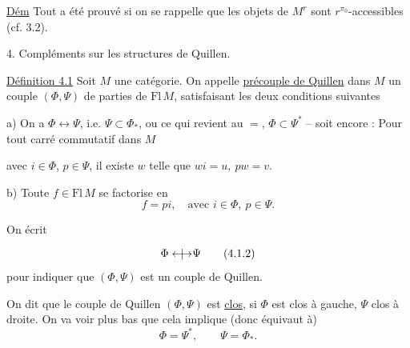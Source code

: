 
\uline{Dém} Tout a été prouvé\unsure{,|\}} si on se rappelle que les
objets de $M^r$ sont $r^{\pi_0}$-accessibles (cf. 3.2).


4. Compléments sur les structures de Quillen.

\uline{Définition 4.1} Soit $M$ une catégorie. On appelle
\uline{précouple de Quillen} dans $M$ un couple
$(\Phi,\Psi)$ de parties de $\mathrm{Fl}\,M$, satisfaisant les
deux conditions suivantes

a) On a $\Phi\longleftrightarrow\Psi$, i.e. $\Psi\subset\Phi_*$, ou ce qui revient
au $=$, $\Phi\subset\Psi^*$  -- soit encore : Pour
tout carré commutatif dans $M$

avec $i\in\Phi$, $p\in\Psi$, il existe $w$ telle que
$wi=u,\ pw=v$.

b) Toute $f\in\mathrm{Fl}\,M$ se factorise en
\[
f=pi,\quad\text{avec }i\in\Phi,\ p\in\Psi.
\]

On écrit
\[
\Phi\mathrel{\overset{\vphantom{I}}{\longleftrightarrow}\mkern-19mu\mid\mkern9mu}\Psi
\tag*{(4.1.2)}
\]
pour indiquer que $(\Phi,\Psi)$ est un couple
de Quillen.

On  dit que le couple de Quillen $(\Phi,\Psi)$
est \uline{clos}, si $\Phi$ est clos à gauche, $\Psi$ clos à droite.
On va voir plus bas  que cela implique (donc
équivaut à)
\[
\Phi=\Psi^*,\qquad\Psi=\Phi_*.
\tag*{(4.1.3.)}
\]
